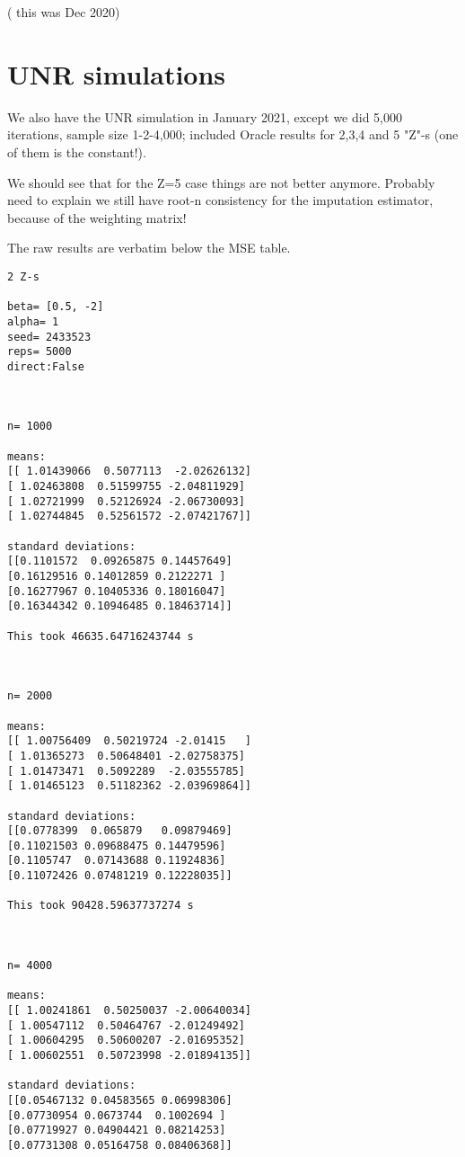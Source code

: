 \documentclass{article}
\theoremstyle{definition}
\theoremstyle{remark}
\begin{document}
( this was Dec 2020)

\section{UNR simulations}

We also have the UNR simulation in January 2021, except we did 5,000 iterations, sample size 1-2-4,000; included Oracle results for 2,3,4 and 5 "Z"-s (one of them is the constant!).

We should see that for the Z=5 case things are not better anymore. Probably need to explain we still have root-n consistency for the imputation estimator, because of the weighting matrix!

The raw results are verbatim below the MSE table.

\begin{verbatim}
2 Z-s

beta= [0.5, -2]
alpha= 1
seed= 2433523
reps= 5000
direct:False



n= 1000

means: 
[[ 1.01439066  0.5077113  -2.02626132]
[ 1.02463808  0.51599755 -2.04811929]
[ 1.02721999  0.52126924 -2.06730093]
[ 1.02744845  0.52561572 -2.07421767]]

standard deviations: 
[[0.1101572  0.09265875 0.14457649]
[0.16129516 0.14012859 0.2122271 ]
[0.16277967 0.10405336 0.18016047]
[0.16344342 0.10946485 0.18463714]]

This took 46635.64716243744 s



n= 2000

means: 
[[ 1.00756409  0.50219724 -2.01415   ]
[ 1.01365273  0.50648401 -2.02758375]
[ 1.01473471  0.5092289  -2.03555785]
[ 1.01465123  0.51182362 -2.03969864]]

standard deviations: 
[[0.0778399  0.065879   0.09879469]
[0.11021503 0.09688475 0.14479596]
[0.1105747  0.07143688 0.11924836]
[0.11072426 0.07481219 0.12228035]]

This took 90428.59637737274 s



n= 4000

means: 
[[ 1.00241861  0.50250037 -2.00640034]
[ 1.00547112  0.50464767 -2.01249492]
[ 1.00604295  0.50600207 -2.01695352]
[ 1.00602551  0.50723998 -2.01894135]]

standard deviations: 
[[0.05467132 0.04583565 0.06998306]
[0.07730954 0.0673744  0.1002694 ]
[0.07719927 0.04904421 0.08214253]
[0.07731308 0.05164758 0.08406368]]


\end{verbatim}
\end{document}
